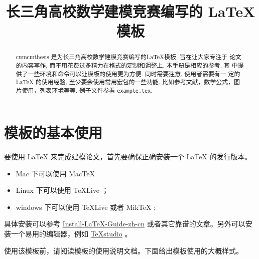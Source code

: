 \documentclass[withoutpreface,bwprint]{cumcmthesis} %
\title{长三角高校数学建模竞赛编写的 \LaTeX{} 模板}
\begin{document}
 \maketitle
 \begin{abstract}
cumcmthesis 是为长三角高校数学建模竞赛编写的\LaTeX{}模板, 旨在让大家专注于 论文的内容写作, 而不用花费过多精力在格式的定制和调整上. 本手册是相应的参考, 其 中提供了一些环境和命令可以让模板的使用更为方便. 同时需要注意, 使用者需要有一 定的 \LaTeX{} 的使用经验, 至少要会使用常用宏包的一些功能, 比如参考文献，数学公式，图片使用，列表环境等等. 例子文件参看 \texttt{example.tex}.



\end{abstract}

\tableofcontents

\newpage

\section{模板的基本使用}

要使用 \LaTeX{} 来完成建模论文，首先要确保正确安装一个 \LaTeX{} 的发行版本。

\begin{itemize}
    \item Mac 下可以使用 Mac\TeX{}
    \item Linux 下可以使用 \TeX{}Live ；
    \item windows 下可以使用 \TeX{}Live 或者 Mik\TeX{} ;
\end{itemize}

具体安装可以参考 \href{https://github.com/OsbertWang/install-latex-guide-zh-cn/releases/}{Install-LaTeX-Guide-zh-cn} 或者其它靠谱的文章。另外可以安装一个易用的编辑器，例如 \href{https://mirrors.tuna.tsinghua.edu.cn/github-release/texstudio-org/texstudio/LatestRelease/}{\TeX{}studio} 。

使用该模板前，请阅读模板的使用说明文档。下面给出模板使用的大概样式。
\end{document}
